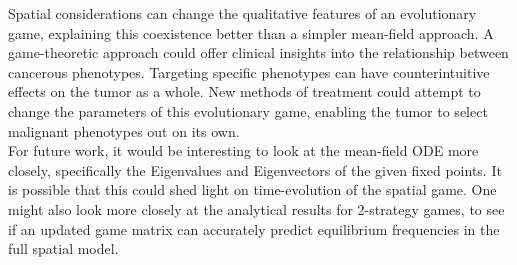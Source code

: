 \documentclass[12pt]{report}
\begin{document}
Spatial considerations can change the qualitative features of an evolutionary game, explaining this coexistence better than a simpler mean-field approach. A game-theoretic approach could offer clinical insights into the relationship between cancerous phenotypes. Targeting specific phenotypes can have counterintuitive effects on the tumor as a whole. New methods of treatment could attempt to change the parameters of this evolutionary game, enabling the tumor to select malignant phenotypes out on its own.\\

For future work, it would be interesting to look at the mean-field ODE more closely, specifically the Eigenvalues and Eigenvectors of the given fixed points. It is possible that this could shed light on time-evolution of the spatial game. One might also look more closely at the analytical results for 2-strategy games, to see if an updated game matrix can accurately predict equilibrium frequencies in the full spatial model. 



\newpage 

\end{document}
